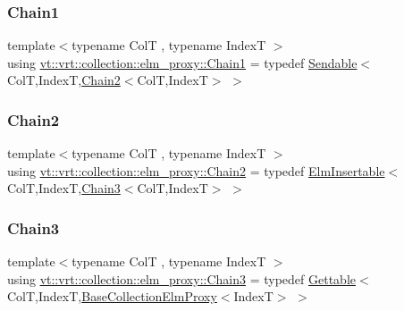 \subsubsection{\texorpdfstring{Chain1}{Chain1}}
{\footnotesize\ttfamily template$<$typename ColT , typename IndexT $>$ \\
using \hyperlink{namespacevt_1_1vrt_1_1collection_1_1elm__proxy_af1c695e3f939aca249111179a57b24bf}{vt\+::vrt\+::collection\+::elm\+\_\+proxy\+::\+Chain1} = typedef \hyperlink{structvt_1_1vrt_1_1collection_1_1_sendable}{Sendable}$<$ColT,IndexT,\hyperlink{namespacevt_1_1vrt_1_1collection_1_1elm__proxy_ad78450181b0704fe0969ae1d0f6cb4c7}{Chain2}$<$ColT,IndexT$>$ $>$}

\mbox{\label{namespacevt_1_1vrt_1_1collection_1_1elm__proxy_ad78450181b0704fe0969ae1d0f6cb4c7}} 
\subsubsection{\texorpdfstring{Chain2}{Chain2}}
{\footnotesize\ttfamily template$<$typename ColT , typename IndexT $>$ \\
using \hyperlink{namespacevt_1_1vrt_1_1collection_1_1elm__proxy_ad78450181b0704fe0969ae1d0f6cb4c7}{vt\+::vrt\+::collection\+::elm\+\_\+proxy\+::\+Chain2} = typedef \hyperlink{structvt_1_1vrt_1_1collection_1_1_elm_insertable}{Elm\+Insertable}$<$ColT,IndexT,\hyperlink{namespacevt_1_1vrt_1_1collection_1_1elm__proxy_a3a1b8a69ce5220709c14028b899f128f}{Chain3}$<$ColT,IndexT$>$ $>$}

\mbox{\label{namespacevt_1_1vrt_1_1collection_1_1elm__proxy_a3a1b8a69ce5220709c14028b899f128f}} 
\subsubsection{\texorpdfstring{Chain3}{Chain3}}
{\footnotesize\ttfamily template$<$typename ColT , typename IndexT $>$ \\
using \hyperlink{namespacevt_1_1vrt_1_1collection_1_1elm__proxy_a3a1b8a69ce5220709c14028b899f128f}{vt\+::vrt\+::collection\+::elm\+\_\+proxy\+::\+Chain3} = typedef \hyperlink{structvt_1_1vrt_1_1collection_1_1_gettable}{Gettable}$<$ColT,IndexT,\hyperlink{structvt_1_1vrt_1_1collection_1_1_base_collection_elm_proxy}{Base\+Collection\+Elm\+Proxy}$<$IndexT$>$ $>$}

